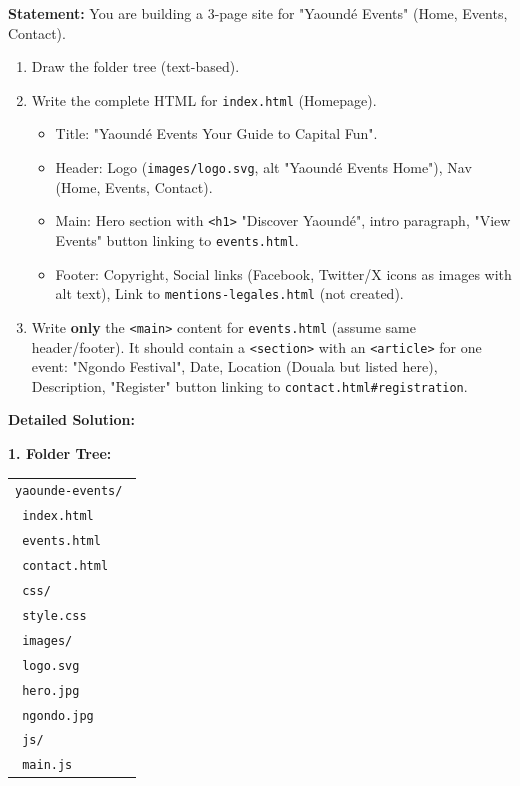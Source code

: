 \documentclass[11pt]{article}
\begin{document}
\begin{exoresolu}
\textbf{Statement:} You are building a 3-page site for "Yaoundé Events" (Home, Events, Contact).
\begin{enumerate}
    \item Draw the folder tree (text-based).
    \item Write the complete HTML for \texttt{index.html} (Homepage).
        \begin{itemize}
            \item Title: "Yaoundé Events \textemdash Your Guide to Capital Fun".
            \item Header: Logo (\texttt{images/logo.svg}, alt "Yaoundé Events Home"), Nav (Home, Events, Contact).
            \item Main: Hero section with \texttt{<h1>} "Discover Yaoundé", intro paragraph, "View Events" button linking to \texttt{events.html}.
            \item Footer: Copyright, Social links (Facebook, Twitter/X icons as images with alt text), Link to \texttt{mentions-legales.html} (not created).
        \end{itemize}
    \item Write \textbf{only} the \texttt{<main>} content for \texttt{events.html} (assume same header/footer). It should contain a \texttt{<section>} with an \texttt{<article>} for one event: "Ngondo Festival", Date, Location (Douala \textemdash but listed here), Description, "Register" button linking to \texttt{contact.html\#registration}.
\end{enumerate}
\tcblower
\textbf{Detailed Solution:}

\textbf{1. Folder Tree:}
\begin{center}
\begin{tabular}{|p{0.95\linewidth}|}\hline
\texttt{yaounde-events/}\\
\texttt{\textbar{}\textbar{} index.html}\\
\texttt{\textbar{}\textbar{} events.html}\\
\texttt{\textbar{}\textbar{} contact.html}\\
\texttt{\textbar{}\textbar{} css/}\\
\texttt{\textbar{}\textbar{} \textbar{}\textbar{} style.css}\\
\texttt{\textbar{}\textbar{} images/}\\
\texttt{\textbar{}\textbar{} \textbar{}\textbar{} logo.svg}\\
\texttt{\textbar{}\textbar{} \textbar{}\textbar{} hero.jpg}\\
\texttt{\textbar{}\textbar{} \textbar{}\textbar{} ngondo.jpg}\\
\texttt{\textbar{}\textbar{} js/}\\
\texttt{\textbar{}\textbar{} \textbar{}\textbar{} main.js}\\\hline
\end{tabular}
\end{center}


\end{exoresolu}
\end{document}
